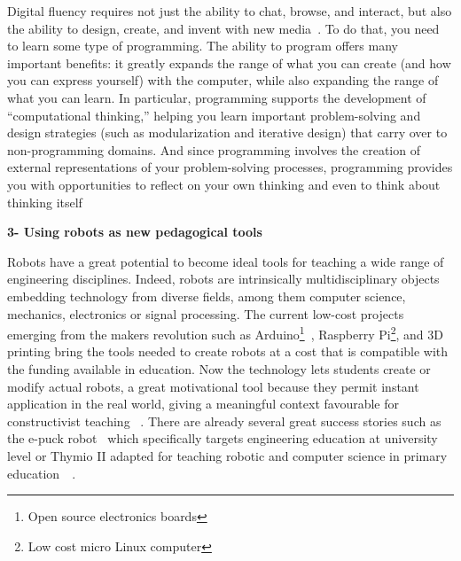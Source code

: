 \begin{formal}
    Digital fluency requires not just the ability to chat, browse, and interact, but also the ability to design, create, and invent with new media~\parencite{resnick2008sowing}. To do that, you need to learn some type of programming. The ability to program offers many important benefits: it greatly expands the range of what you can create (and how you can express yourself) with the computer, while also expanding the range of what you can learn. In particular, programming supports the development of “computational thinking,” helping you learn important problem-solving and design strategies (such as modularization and iterative design) that carry over to non-programming domains. And since programming involves the creation of external representations of your problem-solving processes, programming provides you with opportunities to reflect on your own thinking and even to think about thinking itself~\parencite{disessa2001changing}


\end{formal}


\textbf{3- Using robots as new pedagogical tools}

Robots have a great potential to become ideal tools for teaching a wide range of engineering disciplines. Indeed, robots are intrinsically multidisciplinary objects embedding technology from diverse fields, among them computer science, mechanics, electronics or signal processing.
The current low-cost projects emerging from the makers revolution\parencite{anderson2012makers} such as Arduino\footnote{Open source electronics boards}~\parencite{mellis2007arduino}, Raspberry Pi\footnote{Low cost micro Linux computer}, and 3D printing bring the tools needed to create robots at a cost that is compatible with the funding available in education. Now the technology lets students create or modify actual robots, a great motivational tool because they permit instant application in the real world, giving a meaningful context favourable for constructivist teaching~\parencite{palincsar1998social} \parencite{papert1991situating}.
There are already several great success stories such as the e-puck robot~\parencite{mondada2009puck} which specifically targets engineering education at university level or Thymio II adapted for teaching robotic and computer science in primary education~\parencite{riedo2012two}~\parencite{riedo2013thymio}.




